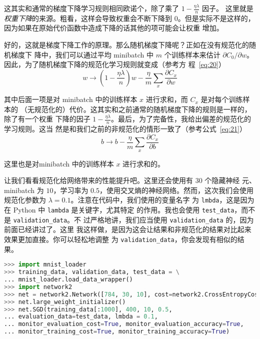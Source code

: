 这其实和通常的梯度下降学习规则相同欧诺个，除了乘了 $1-\frac{\eta\lambda}{n}$ 因子。
这里就是\emph{权重下降}的来源。粗看，这样会导致权重会不断下降到
$0$。但是实际不是这样的，因为如果在原始代价函数中造成下降的话其他的项可能会让权重
增加。

好的，这就是梯度下降工作的原理。那么随机梯度下降呢？正如在没有规范化的随机梯度下
降中，我们可以通过平均 minibatch 中 $m$ 个训练样本来估计
$\partial C_0/\partial w$。因此，为了随机梯度下降的规范化学习规则就变成（参考方
程~\eqref{eq:20}）
\begin{equation} 
  w \rightarrow \left(1-\frac{\eta \lambda}{n}\right) w -\frac{\eta}{m}
  \sum_x \frac{\partial C_x}{\partial w}
  \label{eq:93}\tag{93}
\end{equation}

其中后面一项是对 minibatch 中的训练样本 $x$ 进行求和，而 $C_x$ 是对每个训练样本的
（无规范化的）代价。这其实和之前通常的随机梯度下降的规则是一样的，除了有一个权重
下降的因子
$1-\frac{\eta \lambda}{n}$。最后，为了完备性，我给出偏差的规范化的学习规则。这当
然是和我们之前的非规范化的情形一致了（参考公式~\eqref{eq:21}）
\begin{equation}
  b \rightarrow b - \frac{\eta}{m} \sum_x \frac{\partial C_x}{\partial b}
  \label{eq:94}\tag{94}
\end{equation}

这里也是对minibatch 中的训练样本 $x$ 进行求和的。

让我们看看规范化给网络带来的性能提升吧。这里还会使用有 $30$ 个隐藏神经
元、minibatch 为 $10$，学习率为 $0.5$，使用交叉熵的神经网络。然而，这次我们会使用
规范化参数为 $\lambda = 0.1$。注意在代码中，我们使用的变量名字
为 \lstinline!lmbda!，这是因为在 Python 中 \lstinline!lambda! 是关键字，尤其特定
的作用。我也会使用 \lstinline!test_data!，而不是 \lstinline!validation_data!。不
过严格地讲，我们应当使用 \lstinline!validation_data! 的，因为前面已经讲过了。这里
我这样做，是因为这会让结果和非规范化的结果对比起来效果更加直接。你可以轻松地调整
为 \lstinline!validation_data!，你会发现有相似的结果。

\begin{lstlisting}[language=Python]
>>> import mnist_loader 
>>> training_data, validation_data, test_data = \
... mnist_loader.load_data_wrapper() 
>>> import network2 
>>> net = network2.Network([784, 30, 10], cost=network2.CrossEntropyCost)
>>> net.large_weight_initializer()
>>> net.SGD(training_data[:1000], 400, 10, 0.5,
... evaluation_data=test_data, lmbda = 0.1,
... monitor_evaluation_cost=True, monitor_evaluation_accuracy=True,
... monitor_training_cost=True, monitor_training_accuracy=True)
\end{lstlisting}

